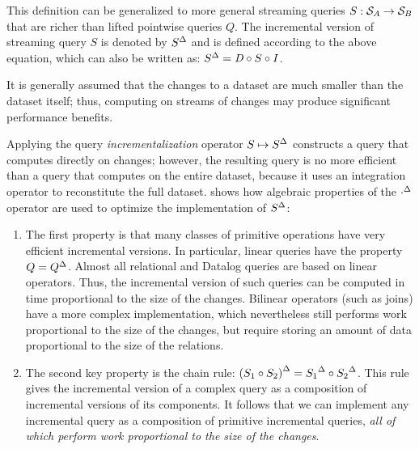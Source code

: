 \begin{center}
\end{center}

This definition can be generalized to more general streaming queries
$S: \mathcal{S}_{A} \to \mathcal{S}_{B}$ that are richer than lifted pointwise queries $Q$.
The incremental version of streaming query $S$ is denoted by ${S}^{\Delta}$ and is defined
according to the above equation, which can also be written as: ${S}^{\Delta} = \mathit{D} \circ S \circ \mathit{I}$.

It is generally assumed that the changes to a dataset are much smaller than
the dataset itself; thus, computing on streams of changes may
produce significant performance benefits.

Applying the query \emph{incrementalization} operator $S \mapsto {S}^{\Delta}$ constructs
a query that computes directly on changes; however, the resulting query is no more
efficient than a query that computes on the entire dataset, because it uses an
integration operator to reconstitute the full dataset.
 shows how algebraic properties of the ${\cdot}^{\Delta}$ operator
are used to optimize the implementation of ${S}^{\Delta}$:

\begin{enumerate}[nosep, leftmargin=0pt, itemindent=0.5cm, label=\textbf{(\arabic*)}]
\item The first property is that many classes of primitive operations have very efficient incremental
versions.  In particular, linear queries have the property $Q = {Q}^{\Delta}$.  Almost all
relational and Datalog queries are based on linear operators.  Thus, the incremental version
of such queries can be computed in time proportional to the size of the changes.  Bilinear
operators (such as joins) have a more complex implementation, which nevertheless still performs
work proportional to the size of the changes, but require storing an amount of data proportional
to the size of the relations.

\item The second key property is the chain rule:
${(S_1 \circ S_2)}^{\Delta} = {S_1}^{\Delta} \circ {S_2}^{\Delta}$.  This rule gives the incremental
version of a complex query as a composition of incremental versions of its components.
It follows that we can implement any incremental query as a composition of primitive
incremental queries, \emph{all of which perform work proportional to the size of the changes}.
\end{enumerate}

